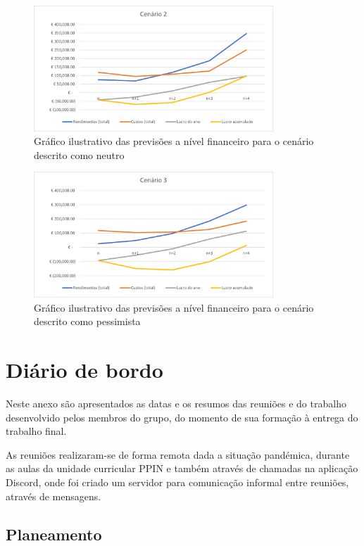 \documentclass[11pt, a4paper, oneside]{book}
\begin{document}
\begin{appendices}
\begin{figure}[ht]
  \centering
  \includegraphics[width = 90mm]{img/graphs/ppin_graph_2.png}
  \caption{Gráfico ilustrativo das previsões a nível financeiro para o cenário descrito como neutro}
\end{figure}

\vspace{-0.5em}

\begin{figure}[ht]
  \centering
  \includegraphics[width = 90mm]{img/graphs/ppin_graph_3.png}
  \caption{Gráfico ilustrativo das previsões a nível financeiro para o cenário descrito como pessimista}
\end{figure}


\chapter{Diário de bordo}

Neste anexo são apresentados as datas e os resumos das reuniões e do trabalho desenvolvido pelos membros do grupo, do momento de sua formação à entrega do trabalho final.

As reuniões realizaram-se de forma remota dada a situação pandémica, durante as aulas da unidade curricular PPIN e também através de chamadas na aplicação Discord, onde foi criado um servidor para comunicação informal entre reuniões, através de mensagens.

\section{Planeamento}


\end{appendices}
\end{document}
